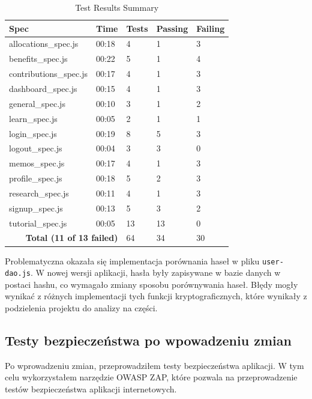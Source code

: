 \begin{table}[H]
  \centering
  \caption{Test Results Summary}
  \label{table:test_results_summary}
  \begin{tabular}{|l|l|l|l|l|}
  \hline
  \textbf{Spec} & \textbf{Time} & \textbf{Tests} & \textbf{Passing} & \textbf{Failing} \\ \hline
  allocations\_spec.js & 00:18 & 4 & 1 & 3 \\ \hline
  benefits\_spec.js & 00:22 & 5 & 1 & 4 \\ \hline
  contributions\_spec.js & 00:17 & 4 & 1 & 3 \\ \hline
  dashboard\_spec.js & 00:15 & 4 & 1 & 3 \\ \hline
  general\_spec.js & 00:10 & 3 & 1 & 2 \\ \hline
  learn\_spec.js & 00:05 & 2 & 1 & 1 \\ \hline
  login\_spec.js & 00:19 & 8 & 5 & 3 \\ \hline
  logout\_spec.js & 00:04 & 3 & 3 & 0 \\ \hline
  memos\_spec.js & 00:17 & 4 & 1 & 3 \\ \hline
  profile\_spec.js & 00:18 & 5 & 2 & 3 \\ \hline
  research\_spec.js & 00:11 & 4 & 1 & 3 \\ \hline
  signup\_spec.js & 00:13 & 5 & 3 & 2 \\ \hline
  tutorial\_spec.js & 00:05 & 13 & 13 & 0 \\ \hline
  \multicolumn{2}{|r|}{\textbf{Total (11 of 13 failed)}} & 64 & 34 & 30 \\ \hline
  \end{tabular}
  \end{table}

Problematyczna okazała się implementacja porównania haseł w pliku \texttt{user-dao.js}. W nowej wersji aplikacji, hasła były zapisywane w bazie danych w postaci hashu, co wymagało zmiany sposobu porównywania haseł. Błędy mogły wynikać z różnych implementacji tych funkcji kryptograficznych, które wynikały z podzielenia projektu do analizy na części.

\subsection{Testy bezpieczeństwa po wpowadzeniu zmian}
Po wprowadzeniu zmian, przeprowadziłem testy bezpieczeństwa aplikacji. W tym celu wykorzystałem narzędzie OWASP ZAP, które pozwala na przeprowadzenie testów bezpieczeństwa aplikacji internetowych. 
